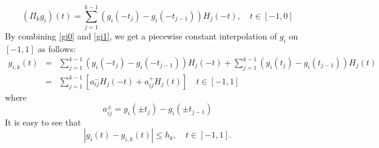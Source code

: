 \begin{equation}\label{gi1}
	(\Pi_k g_i)(t)=\sum_{j=1}^{k-1}(g_i(-t_j) - g_i(-t_{j-1}))H_j(-t), \quad t\in [-1,0]
\end{equation}
By combining \eqref{gi0} and \eqref{gi1}, we get a piecewise constant
interpolation of $g_i$ on $[-1,1]$ as follows:
\begin{eqnarray}
	g_{i,k}(t)&=&
	\sum_{j=1}^{k-1}(g_i(-t_j) - g_i(-t_{j-1}))H_j(-t)+\sum_{j=1}^{k-1}(g_i(t_j) - g_i(t_{j-1})) H_{j}(t)\nonumber \\ 
	&=&\sum_{j=1}^{k-1}[a_{ij}^-H_j(-t)+a_{ij}^+H_{j}(t)] \label{gih}
	\quad t\in [-1,1]
\end{eqnarray}
where 
$$
a_{ij}^{\pm}=g_i(\pm t_j) - g_i(\pm t_{j-1})
$$
It is easy to see that
\begin{equation}
	|g_i(t)-g_{i,k}(t)|\le h_k, \quad t\in [-1,1].
\end{equation} 

